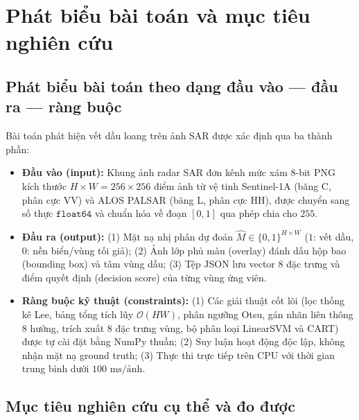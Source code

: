 \section{Phát biểu bài toán và mục tiêu nghiên cứu}
\label{sec:phat_bieu_muc_tieu}

\subsection{Phát biểu bài toán theo dạng đầu vào --- đầu ra --- ràng buộc}

Bài toán phát hiện vết dầu loang trên ảnh SAR được xác định qua ba thành phần:
\begin{itemize}
    \item \textbf{Đầu vào (input):} Khung ảnh radar SAR đơn kênh mức xám 8-bit PNG kích thước $H \times W = 256 \times 256$ điểm ảnh từ vệ tinh Sentinel-1A (băng C, phân cực VV) và ALOS PALSAR (băng L, phân cực HH), được chuyển sang số thực $\texttt{float64}$ và chuẩn hóa về đoạn $[0, 1]$ qua phép chia cho $255$.
    \item \textbf{Đầu ra (output):} (1) Mặt nạ nhị phân dự đoán $\hat{M} \in \{0, 1\}^{H \times W}$ ($1$: vết dầu, $0$: nền biển/vùng tối giả); (2) Ảnh lớp phủ màu (overlay) đánh dấu hộp bao (bounding box) và tâm vùng dầu; (3) Tệp JSON lưu vector 8 đặc trưng và điểm quyết định (decision score) của từng vùng ứng viên.
    \item \textbf{Ràng buộc kỹ thuật (constraints):} (1) Các giải thuật cốt lõi (lọc thống kê Lee, bảng tổng tích lũy $\mathcal{O}(HW)$, phân ngưỡng Otsu, gán nhãn liên thông 8 hướng, trích xuất 8 đặc trưng vùng, bộ phân loại LinearSVM và CART) được tự cài đặt bằng NumPy thuần; (2) Suy luận hoạt động độc lập, không nhận mặt nạ ground truth; (3) Thực thi trực tiếp trên CPU với thời gian trung bình dưới $100\text{ ms/ảnh}$.
\end{itemize}

\subsection{Mục tiêu nghiên cứu cụ thể và đo được}

